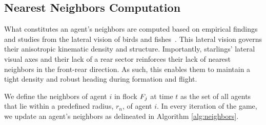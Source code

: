 \subsection{Nearest Neighbors Computation}
%
What constitutes an agent's neighbors are computed based on empirical findings and studies from the lateral vision of birds and fishes~\cite{Ballerini1232, JadbabaieCoord, Helbing20}. This lateral vision governs their anisotropic kinematic density and structure. Importantly, starlings' lateral visual axes and their lack of a rear sector reinforces their lack of nearest neighbors in the front-rear direction. As such, this enables them to maintain a tight density and robust heading during formation and flight.

\begin{definition}
	We define the neighbors of agent $i$ in flock $F_j$ at time $t$ as the set of all agents that lie within a predefined radius, $r_n$, of agent $i$. In every iteration of the game, we update an agent's neighbors as delineated in Algorithm \ref{alg:neighbors}.
\end{definition}
%


